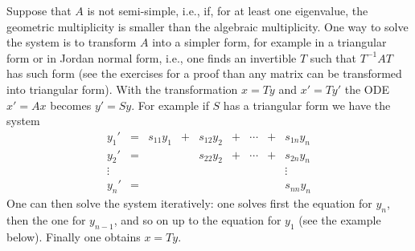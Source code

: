 \documentclass[12pt]{report}
\begin{document}
Suppose that $A$ is not semi-simple, i.e.,  if, for at least one eigenvalue, 
the geometric multiplicity  is smaller than the algebraic multiplicity.  
One way to solve the system is to transform $A$
into a simpler form, for example in a triangular form or in Jordan
normal form, i.e., one finds an invertible $T$ such that $T^{-1} A T$
has such form (see the exercises for a proof than any matrix can be transformed into
triangular form).    With the transformation $x = Ty$ and $x'=Ty'$ the ODE
$x'=Ax$ becomes $y'=Sy$. For example if $S$ has a triangular form we
have the system
\begin{equation}
\begin{array}{ccccccccc}
 y_1'   & =& s_{11} y_1 & + & s_{12}y_2 & + &  \cdots & + &  s_{1n}y_n  \\
 y_2'   & =&            &   & s_{22}y_2 & + &  \cdots & + &  s_{2n}y_n  \\
\vdots  &  &            &   &           &   &         &   &  \vdots     \\
 y_n'   & =&            &   &           &   &         &   &  s_{nn}y_n  
\end{array}
\end{equation}
One can then solve the system iteratively: one solves first the
equation for $y_n$, then the one for $y_{n-1}$, and so on up to the
equation for $y_1$ (see the example below). Finally one obtains $x= Ty$.
\end{document}
